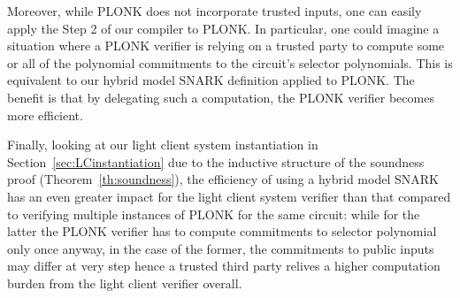 \noindent Moreover, while PLONK does not incorporate trusted inputs, one can easily apply the Step 2 of our compiler to PLONK. In particular, one could imagine a situation 
where a PLONK verifier is relying on a trusted party to compute some or all of the polynomial commitments to the circuit's selector polynomials. This is equivalent to our hybrid 
model SNARK definition applied to PLONK. The benefit is that by delegating such a computation, the PLONK verifier becomes more efficient. \\ %


\begin{comment}
The next paragraph should be commented out if we do not include in the submission the light client model instantiation section, i.e., section 5.3 of the eprint version.
\end{comment}

\noindent Finally, looking at our light client system instantiation in Section~\ref{sec:LCinstantiation} due to the inductive structure of the soundness proof (Theorem~\ref{th:soundness}), 
the efficiency of using a hybrid model SNARK has an even greater impact for the light client system verifier than that compared to verifying multiple instances of PLONK for the same circuit:
while for the latter the PLONK verifier has to compute commitments to selector polynomial only once anyway, in the case of the former, the commitments to public inputs may differ 
at very step hence a trusted third party relives a higher computation burden from the light client verifier overall. 


